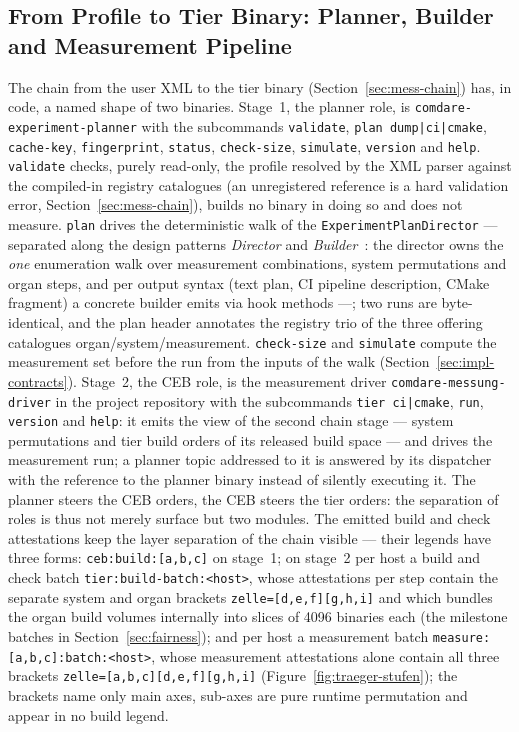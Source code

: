 \begin{nurlang}
\subsection{From Profile to Tier Binary: Planner, Builder and Measurement Pipeline}\label{sec:impl-pipeline}
The chain from the user XML to the tier binary (Section~\ref{sec:mess-chain}) has, in code, a named
shape of two binaries. Stage~1, the planner role, is \texttt{comdare-experiment-planner} with the
subcommands \texttt{validate}, \texttt{plan dump|ci|cmake}, \texttt{cache-key}, \texttt{fingerprint},
\texttt{status}, \texttt{check-size}, \texttt{simulate}, \texttt{version} and \texttt{help}.
\texttt{validate} checks, purely read-only, the profile resolved by the XML parser against the
compiled-in registry catalogues (an unregistered reference is a hard validation error,
Section~\ref{sec:mess-chain}), builds no binary in doing so and does not measure. \texttt{plan} drives
the deterministic walk of the \texttt{ExperimentPlanDirector} --- separated along the design patterns
\emph{Director} and \emph{Builder}~\cite{gamma1994patterns}: the director owns the \emph{one}
enumeration walk over measurement combinations, system permutations and organ steps, and per output
syntax (text plan, CI pipeline description, CMake fragment) a concrete builder emits via hook methods
---; two runs are byte-identical, and the plan header annotates the registry trio of the three offering
catalogues organ/system/measurement. \texttt{check-size} and \texttt{simulate} compute the measurement
set before the run from the inputs of the walk (Section~\ref{sec:impl-contracts}). Stage~2, the CEB
role, is the measurement driver \texttt{comdare-messung-driver} in the project repository with the
subcommands \texttt{tier ci|cmake}, \texttt{run}, \texttt{version} and \texttt{help}: it emits the view
of the second chain stage --- system permutations and tier build orders of its released build space ---
and drives the measurement run; a planner topic addressed to it is answered by its dispatcher with the
reference to the planner binary instead of silently executing it. The planner steers the CEB orders,
the CEB steers the tier orders: the separation of roles is thus not merely surface but two modules. The
emitted build and check attestations keep the layer separation of the chain visible --- their legends
have three forms: \texttt{ceb:build:[a,b,c]} on stage~1; on stage~2 per host a build and check batch
\texttt{tier:build-batch:<host>}, whose attestations per step contain the separate system and organ
brackets \texttt{zelle=[d,e,f][g,h,i]} and which bundles the organ build volumes internally into slices
of 4096 binaries each (the milestone batches in Section~\ref{sec:fairness}); and per host a measurement
batch \texttt{measure:[a,b,c]:batch:<host>}, whose measurement attestations alone contain all three
brackets \texttt{zelle=[a,b,c][d,e,f][g,h,i]} (Figure~\ref{fig:traeger-stufen}); the brackets name only
main axes, sub-axes are pure runtime permutation and appear in no build legend.


\end{nurlang}
